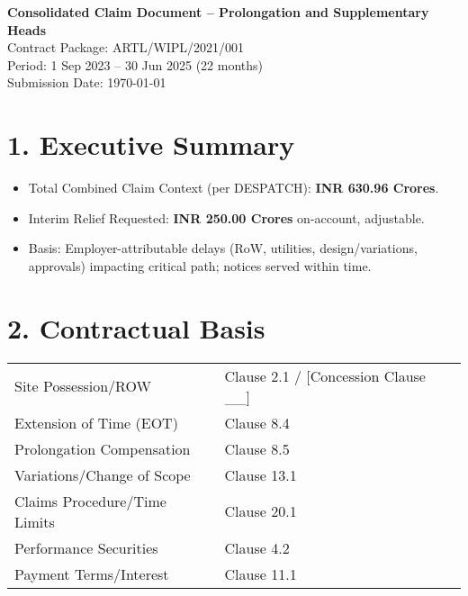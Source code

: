 \documentclass[12pt,letterpaper]{article}
\begin{document}
\begin{center}
\textbf{Consolidated Claim Document – Prolongation and Supplementary Heads}\\
Contract Package: ARTL/WIPL/2021/001\\
Period: 1 Sep 2023 – 30 Jun 2025 (22 months)\\
Submission Date: \today
\end{center}

\section*{1. Executive Summary}
\begin{itemize}
  \item Total Combined Claim Context (per DESPATCH): \textbf{INR 630.96 Crores}.
  \item Interim Relief Requested: \textbf{INR 250.00 Crores} on-account, adjustable.
  \item Basis: Employer-attributable delays (RoW, utilities, design/variations, approvals) impacting critical path; notices served within time.
\end{itemize}

\section*{2. Contractual Basis}
\begin{longtable}{p{}p{}}
Site Possession/ROW & Clause 2.1 / [Concession Clause __] \\
Extension of Time (EOT) & Clause 8.4 \\
Prolongation Compensation & Clause 8.5 \\
Variations/Change of Scope & Clause 13.1 \\
Claims Procedure/Time Limits & Clause 20.1 \\
Performance Securities & Clause 4.2 \\
Payment Terms/Interest & Clause 11.1 \\
\end{longtable}
\end{document}
